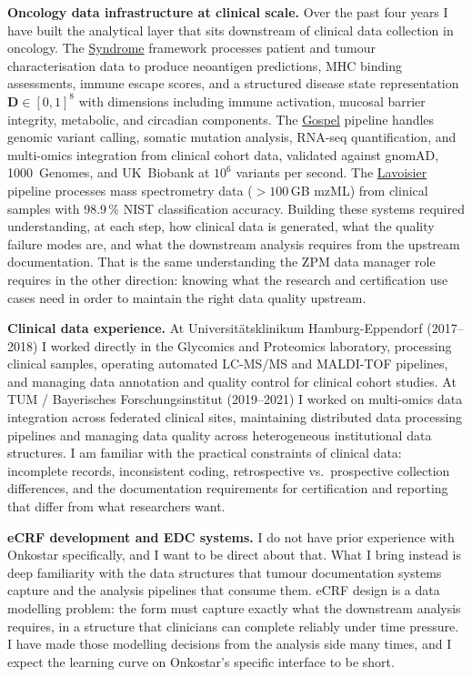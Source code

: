 \documentclass[12pt,a4paper]{article}
\begin{document}
\textbf{Oncology data infrastructure at clinical scale.}
Over the past four years I have built the analytical layer that sits downstream
of clinical data collection in oncology.
The \href{https://syndrome-seven.vercel.app/tools}{Syndrome} framework processes
patient and tumour characterisation data to produce neoantigen predictions,
MHC binding assessments, immune escape scores, and a structured disease state
representation $\mathbf{D}\in[0,1]^8$ with dimensions including immune activation,
mucosal barrier integrity, metabolic, and circadian components.
The \href{https://github.com/fullscreen-triangle/gospel}{Gospel} pipeline
handles genomic variant calling, somatic mutation analysis, RNA-seq quantification,
and multi-omics integration from clinical cohort data, validated against
gnomAD, 1000~Genomes, and UK~Biobank at $10^6$ variants per second.
The \href{https://github.com/fullscreen-triangle/lavoisier}{Lavoisier} pipeline
processes mass spectrometry data ($>100$\,GB mzML) from clinical samples with
98.9\,\% NIST classification accuracy.
Building these systems required understanding, at each step, how clinical
data is generated, what the quality failure modes are, and what the downstream
analysis requires from the upstream documentation.
That is the same understanding the ZPM data manager role requires in the
other direction: knowing what the research and certification use cases need
in order to maintain the right data quality upstream.

\textbf{Clinical data experience.}
At Universitätsklinikum Hamburg-Eppendorf (2017--2018) I worked directly
in the Glycomics and Proteomics laboratory, processing clinical samples,
operating automated LC-MS/MS and MALDI-TOF pipelines, and managing data
annotation and quality control for clinical cohort studies.
At TUM / Bayerisches Forschungsinstitut (2019--2021) I worked on
multi-omics data integration across federated clinical sites, maintaining
distributed data processing pipelines and managing data quality across
heterogeneous institutional data structures.
I am familiar with the practical constraints of clinical data: incomplete
records, inconsistent coding, retrospective vs.\ prospective collection
differences, and the documentation requirements for certification and
reporting that differ from what researchers want.

\textbf{eCRF development and EDC systems.}
I do not have prior experience with Onkostar specifically, and I want to
be direct about that.
What I bring instead is deep familiarity with the data structures
that tumour documentation systems capture and the analysis pipelines
that consume them.
eCRF design is a data modelling problem: the form must capture exactly
what the downstream analysis requires, in a structure that clinicians
can complete reliably under time pressure.
I have made those modelling decisions from the analysis side many times,
and I expect the learning curve on Onkostar's specific interface to be short.
\end{document}
